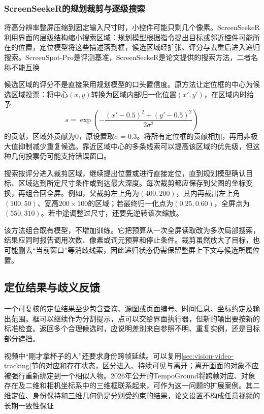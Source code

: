 \subsubsection{ScreenSeekeR的规划裁剪与逐级搜索}
\label{sec:vision-understanding-screenseeker}

将高分辨率整屏压缩到固定输入尺寸时，小控件可能只剩几个像素。ScreenSeekeR利用界面的层级结构缩小搜索区域：规划模型根据指令提出目标或邻近控件可能所在的位置，定位模型将这些描述落到框，候选区域经扩张、评分与去重后进入递归搜索。ScreenSpot-Pro是评测基准，ScreenSeekeR是论文提供的搜索方法，二者名称不能互换

候选区域的评分不是直接采用规划模型的口头置信度。原方法让定位框的中心为候选区域投票：将中心$(x,y)$转换为区域内部归一化位置$(x',y')$，在区域内时给予
\[
  s=\exp\!\left(-\frac{(x'-0.5)^2+(y'-0.5)^2}{2\sigma^2}\right)
\]
的贡献，区域外贡献为0，原设置取$\sigma=0.3$。将所有定位框的贡献相加，再用非极大值抑制减少重复候选。靠近区域中心的多条线索可以提高该区域的优先级，但这种几何投票仍可能支持错误窗口。

搜索按评分进入裁剪区域，继续提出位置或进行直接定位，直到规划模型确认目标、区域达到所定尺寸条件或到达最大深度。每次裁剪都应保存到父图的坐标变换，再组合回全屏。例如，父裁剪左上角为$(400,200)$，其内再裁出左上角$(100,50)$、宽高$200\times100$的区域；若最终归一化点为$(0.25,0.60)$，全屏点为$(550,310)$。若中途调整过尺寸，还要先逆转该次缩放。

该方法组合既有模型，不增加训练。它把预算从一次全屏读取改为多次局部搜索，结果应同时报告调用次数、像素或词元预算和停止条件。裁剪虽然放大了目标，也可能删去“当前窗口”等消歧线索，因此递归状态仍需保留整屏上下文与候选所属位置。

\subsection{定位结果与歧义反馈}
\label{sec:vision-understanding-grounding-output}

一个可复核的定位结果至少包含查询、源图或页面编号、时间信息、坐标约定及输出范围。框可以继续作为分割提示，点可以交给界面执行器，但新的输出要按新的标准检查。返回多个合理候选时，应说明差别来自参照不明、重复实例，还是目标部分遮挡。

视频中“刚才拿杯子的人”还要求身份跨帧延续。可以复用\ref{sec:vision-video-tracking}节的对应和存在状态，区分进入、持续可见与离开；离开画面的对象不应被强行重新绑定到一个相似人物。2026年公开的TempoGround将跨帧对应、对象存在及二维和相机坐标系中的三维框联系起来，可作为这一问题的扩展案例。其二维定位、身份保持和三维几何仍是分别受约束的结果，论文设置不构成任意视频的长期一致性保证

